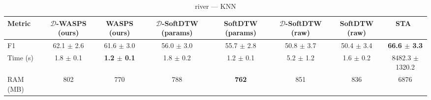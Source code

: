 \begin{table}[htbp]
\centering
\begin{NiceTabular}{lccccccc}
\toprule
Metric & $\mathcal{D}$-WASPS (ours) & WASPS (ours) & $\mathcal{D}$-SoftDTW (params) & SoftDTW (params) & $\mathcal{D}$-SoftDTW (raw) & SoftDTW (raw) & STA~\cite{janati2020spatio} \\
\midrule
F1 & 62.1 $\pm$ 2.6 & 61.6 $\pm$ 3.0 & 56.0 $\pm$ 3.0 & 55.7 $\pm$ 2.8 & 50.8 $\pm$ 3.7 & 50.4 $\pm$ 3.4 & \textbf{66.6 $\pm$ 3.3} \\
Time (s) & 1.8 $\pm$ 0.1 & \textbf{1.2 $\pm$ 0.1} & 1.8 $\pm$ 0.2 & 1.2 $\pm$ 0.1 & 5.2 $\pm$ 1.2 & 1.6 $\pm$ 0.2 & 8482.3 $\pm$ 1320.2 \\
RAM (MB) & 802 & 770 & 788 & \textbf{762} & 851 & 836 & 6876 \\
\bottomrule
\end{NiceTabular}
\caption{river --- KNN}
\label{tab:exp1_river_knn}
\end{table}
